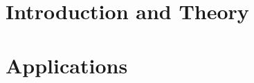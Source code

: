 \documentclass[11pt,a4paper,bibtotoc,idxtotoc,headsepline,footsepline,footexclude,BCOR12mm,DIV13]{scrbook}
\begin{document}
	\frontmatter
	
	
	
%	
%	
	
	
%	
	\clearemptydoublepage
	
	
 
	
	
	
	
	
	
        

	\tableofcontents
  

	\mainmatter
	
	
		\part[Introduction and Theory]{Introduction and Theory}
		\label{part:introAndBackgroundTheory}

                
                
                

		
                
                

                                
		\part[Applications]{Applications}
		\label{part:secondP}
                
		

                
		
		
\end{document}
